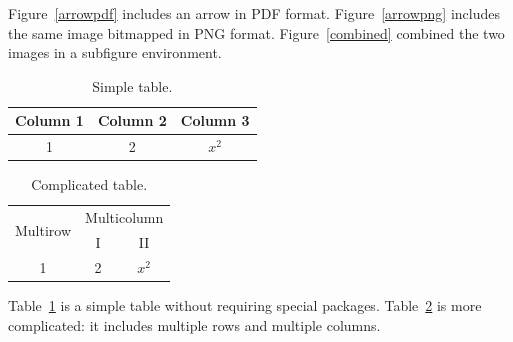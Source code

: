 \documentclass{article}
\begin{document}
Figure~\ref{arrowpdf} includes an arrow in PDF format. Figure~\ref{arrowpng} includes the same image bitmapped in PNG format. Figure~\ref{combined} combined the two images in a subfigure environment.

\begin{table}
  \centering
  \begin{tabular}{c|c|c}
  Column 1 & Column 2 & Column 3\\
  \hline
  1&2& $x^{2}$\\
  \hline
  \end{tabular}
  \caption{Simple table.}
  \label{simple}
\end{table}

\begin{table}
  \centering
  \begin{tabular}{|c|c|c|}
  \hline
  \multirow{2}{*}{Multirow}&\multicolumn{2}{|c|}{Multicolumn}\\
  \cline{2-3}
  &I&II\\
  \hline
  1&2& $x^{2}$\\
  \hline
  \end{tabular}
  \caption{Complicated table.}
  \label{complicated}
\end{table}

Table~\ref{simple} is a simple table without requiring special packages. Table~\ref{complicated} is more complicated: it includes multiple rows and multiple columns.



\end{document}
